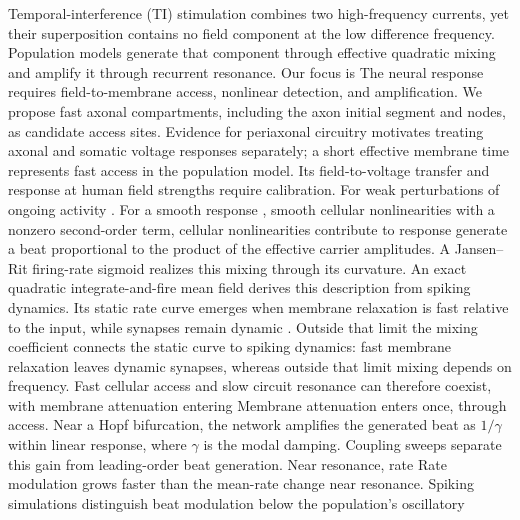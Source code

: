\documentclass[11pt,a4paper]{article}
\providecommand{\DIFaddtex}[1]{{\protect\color{blue} \sf #1}} %
\providecommand{\DIFdeltex}[1]{{\protect\color{red} \scriptsize #1}} %
\providecommand{\DIFaddbegin}{} %
\providecommand{\DIFaddend}{} %
\providecommand{\DIFdelbegin}{} %
\providecommand{\DIFdelend}{} %
\providecommand{\DIFadd}[1]{\texorpdfstring{\DIFaddtex{#1}}{#1}} %
\providecommand{\DIFdel}[1]{\texorpdfstring{\DIFdeltex{#1}}{}} %
\begin{document}
\else
\noindent
Temporal-interference (TI) stimulation combines two high-frequency currents, yet
their superposition contains no field component at the low difference frequency.
\DIFdelbegin \DIFdel{Population
models generate that component through effective quadratic mixing and amplify it through
recurrent resonance.
Our focus is }\DIFdelend \DIFaddbegin \DIFadd{The neural response requires field-to-membrane access, nonlinear detection, and
amplification. We propose fast axonal compartments, including the axon initial
segment and nodes, as candidate access sites. Evidence for periaxonal circuitry
motivates treating axonal and somatic voltage responses separately; a short
effective membrane time represents fast access in the population model.
Its field-to-voltage transfer and response at human field strengths require calibration.
For }\DIFaddend weak perturbations of ongoing activity\DIFdelbegin \DIFdel{. For a smooth response }\DIFdelend \DIFaddbegin \DIFadd{, smooth cellular nonlinearities }\DIFaddend with
a nonzero second-order \DIFdelbegin \DIFdel{term,
cellular nonlinearities contribute to }\DIFdelend \DIFaddbegin \DIFadd{response generate }\DIFaddend a beat proportional to the product of
the \DIFaddbegin \DIFadd{effective }\DIFaddend carrier amplitudes. A Jansen--Rit firing-rate sigmoid realizes this
mixing through its curvature. An exact quadratic integrate-and-fire mean field
\DIFdelbegin \DIFdel{derives this description from spiking
dynamics. Its static rate curve emerges when membrane relaxation is fast relative to the
input, while synapses remain dynamic . Outside that limit the mixing coefficient }\DIFdelend \DIFaddbegin \DIFadd{connects the static curve to spiking dynamics: fast membrane relaxation leaves
dynamic synapses, whereas outside that limit mixing }\DIFaddend depends on frequency.
\DIFdelbegin \DIFdel{Fast cellular access and slow circuit resonance can therefore coexist, with
membrane attenuation entering }\DIFdelend \DIFaddbegin \DIFadd{Membrane attenuation enters }\DIFaddend once, through access. Near a Hopf bifurcation, the
network amplifies the generated beat as $1/\gamma$ within linear response, where
$\gamma$ is \DIFdelbegin \DIFdel{the }\DIFdelend modal damping. Coupling sweeps separate this gain from leading-order
beat generation. \DIFdelbegin \DIFdel{Near resonance,
rate }\DIFdelend \DIFaddbegin \DIFadd{Rate }\DIFaddend modulation grows faster than the mean-rate change \DIFaddbegin \DIFadd{near
resonance}\DIFaddend . Spiking simulations distinguish beat modulation below the \DIFdelbegin \DIFdel{population's }\DIFdelend oscillatory
\end{document}
